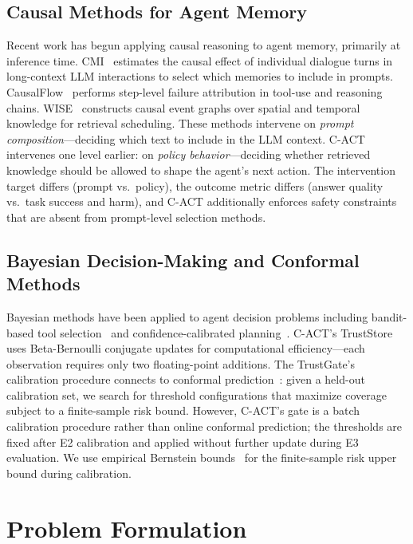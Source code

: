 \documentclass[letterpaper]{article}
\begin{document}
\subsection{Causal Methods for Agent Memory}

Recent work has begun applying causal reasoning to agent memory, primarily at inference time. CMI~\cite{cmi2026} estimates the causal effect of individual dialogue turns in long-context LLM interactions to select which memories to include in prompts. CausalFlow~\cite{causalflow2026} performs step-level failure attribution in tool-use and reasoning chains. WISE~\cite{wise2026} constructs causal event graphs over spatial and temporal knowledge for retrieval scheduling. These methods intervene on \emph{prompt composition}---deciding which text to include in the LLM context. \textsc{C-ACT} intervenes one level earlier: on \emph{policy behavior}---deciding whether retrieved knowledge should be allowed to shape the agent's next action. The intervention target differs (prompt vs.~policy), the outcome metric differs (answer quality vs.~task success and harm), and \textsc{C-ACT} additionally enforces safety constraints that are absent from prompt-level selection methods.

\subsection{Bayesian Decision-Making and Conformal Methods}

Bayesian methods have been applied to agent decision problems including bandit-based tool selection~\cite{ael2026} and confidence-calibrated planning~\cite{ccp2026}. \textsc{C-ACT}'s TrustStore uses Beta-Bernoulli conjugate updates for computational efficiency---each observation requires only two floating-point additions. The TrustGate's calibration procedure connects to conformal prediction~\cite{conformal}: given a held-out calibration set, we search for threshold configurations that maximize coverage subject to a finite-sample risk bound. However, \textsc{C-ACT}'s gate is a batch calibration procedure rather than online conformal prediction; the thresholds are fixed after E2 calibration and applied without further update during E3 evaluation. We use empirical Bernstein bounds~\cite{anytime} for the finite-sample risk upper bound during calibration.

\section{Problem Formulation}
\end{document}
